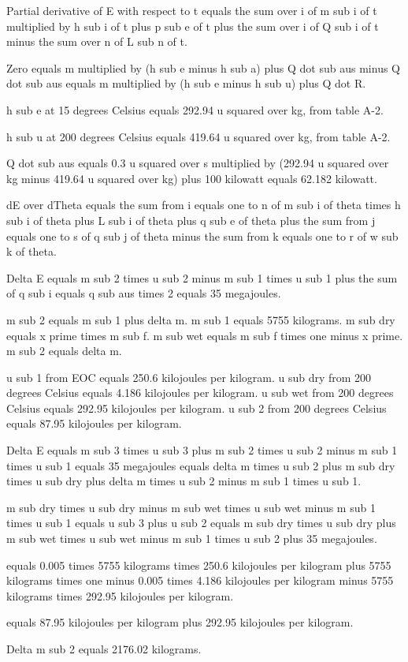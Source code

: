 Partial derivative of E with respect to t equals the sum over i of m sub i of t multiplied by h sub i of t plus p sub e of t plus the sum over i of Q sub i of t minus the sum over n of L sub n of t.

Zero equals m multiplied by (h sub e minus h sub a) plus Q dot sub aus minus Q dot sub aus equals m multiplied by (h sub e minus h sub u) plus Q dot R.

h sub e at 15 degrees Celsius equals 292.94 u squared over kg, from table A-2.

h sub u at 200 degrees Celsius equals 419.64 u squared over kg, from table A-2.

Q dot sub aus equals 0.3 u squared over s multiplied by (292.94 u squared over kg minus 419.64 u squared over kg) plus 100 kilowatt equals 62.182 kilowatt.

dE over dTheta equals the sum from i equals one to n of m sub i of theta times h sub i of theta plus L sub i of theta plus q sub e of theta plus the sum from j equals one to s of q sub j of theta minus the sum from k equals one to r of w sub k of theta.

Delta E equals m sub 2 times u sub 2 minus m sub 1 times u sub 1 plus the sum of q sub i equals q sub aus times 2 equals 35 megajoules.

m sub 2 equals m sub 1 plus delta m. m sub 1 equals 5755 kilograms. m sub dry equals x prime times m sub f. m sub wet equals m sub f times one minus x prime. m sub 2 equals delta m.

u sub 1 from EOC equals 250.6 kilojoules per kilogram. u sub dry from 200 degrees Celsius equals 4.186 kilojoules per kilogram. u sub wet from 200 degrees Celsius equals 292.95 kilojoules per kilogram. u sub 2 from 200 degrees Celsius equals 87.95 kilojoules per kilogram.

Delta E equals m sub 3 times u sub 3 plus m sub 2 times u sub 2 minus m sub 1 times u sub 1 equals 35 megajoules equals delta m times u sub 2 plus m sub dry times u sub dry plus delta m times u sub 2 minus m sub 1 times u sub 1.

m sub dry times u sub dry minus m sub wet times u sub wet minus m sub 1 times u sub 1 equals u sub 3 plus u sub 2 equals m sub dry times u sub dry plus m sub wet times u sub wet minus m sub 1 times u sub 2 plus 35 megajoules.

equals 0.005 times 5755 kilograms times 250.6 kilojoules per kilogram plus 5755 kilograms times one minus 0.005 times 4.186 kilojoules per kilogram minus 5755 kilograms times 292.95 kilojoules per kilogram.

equals 87.95 kilojoules per kilogram plus 292.95 kilojoules per kilogram.

Delta m sub 2 equals 2176.02 kilograms.